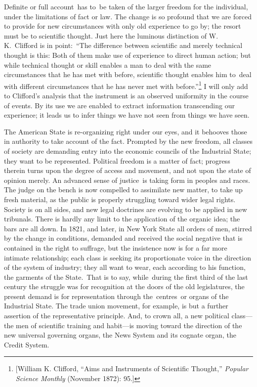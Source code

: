 \documentclass[openany,nobib]{tufte-book}
\begin{document}
Definite or full account~has to~be taken of the larger freedom for the
individual, under the limitations of fact or law. The change is so
profound that we are forced to provide for new circumstances with only
old experience to go by; the resort must be to scientific thought. Just
here the luminous distinction of W. K.~Clifford is in point:~``The
difference between scientific and merely technical thought is this: Both
of them make use of experience to direct human action; but while
technical thought or skill enables a man to deal with the same
circumstances that he has met with before, scientific thought enables
him to~deal with different circumstances that he has never met with
before.''\footnote{{[}William K. Clifford, ``Aims and Instruments of
  Scientific Thought,'' \emph{Popular Science Monthly} (November 1872):
  95.{]}} I will only add to Clifford's analysis that the instrument is
an observed uniformity in the course of events. By its use we are
enabled to extract information transcending our experience; it leads us
to infer things we have not seen from things we have seen.~

The American State is re-organizing right under our eyes, and it
behooves those in authority to take account of the fact. Prompted by the
new freedom, all classes of society are demanding entry into the
economic councils of the Industrial State; they want to be represented.
Political freedom is a matter of fact; progress therein turns upon the
degree of access and movement, and not upon the state of opinion merely.
An advanced sense of justice~is taking form in peoples and races. The
judge on the bench is now compelled to assimilate new matter, to take up
fresh material, as the public is properly struggling toward wider legal
rights. Society is on all sides, and new legal doctrines are evolving to
be applied in new tribunals. There is hardly any limit to the
application of the organic idea; the bars are all down. In 1821, and
later, in New York State all orders of men, stirred by the change in
conditions, demanded and received the social negative that is contained
in the right to suffrage, but the insistence now is for a far more
intimate relationship; each class is seeking its proportionate voice in
the direction of the system of industry; they all want to wear, each
according to his function, the garments of the State.~That is to say,
while~during the first third of the last century the struggle was for
recognition at the doors of the old legislatures, the present demand is
for representation through the~centres~or organs of the Industrial
State. The trade union movement, for example, is but a further assertion
of the representative principle. And, to crown all, a new political
class---the men of scientific training and habit---is moving toward the
direction of the new universal governing organs, the News System and its
cognate organ, the Credit System.~
\end{document}
